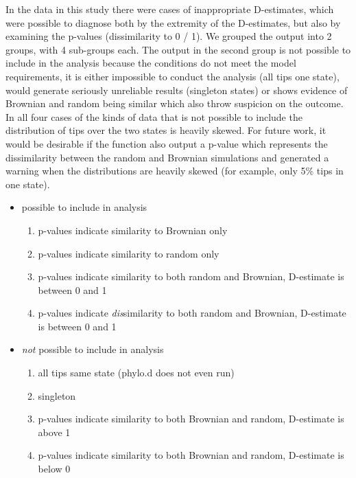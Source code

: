 \documentclass[12pt,letterpaper]{article}
\begin{document}
In the data in this study there were cases of inappropriate D-estimates, which were possible to diagnose both by the extremity of the D-estimates, but also by examining the p-values (dissimilarity to 0 / 1). We grouped the output into 2 groups, with 4 sub-groups each. The output in the second group is not possible to include in the analysis because the conditions do not meet the model requirements, it is either impossible to conduct the analysis (all tips one state), would generate seriously unreliable results (singleton states) or shows evidence of Brownian and random being similar which also throw suspicion on the outcome. In all four cases of the kinds of data that is not possible to include the distribution of tips over the two states is heavily skewed. For future work, it would be desirable if the function also output a p-value which represents the dissimilarity between the random and Brownian simulations and generated a warning when the distributions are heavily skewed (for example, only 5\% tips in one state). 


\begin{itemize}
    \item \colorbox{spec_color_lightgreen!50}{possible to include in analysis}
    \begin{enumerate}[label=(\roman*)]
     \item p-values indicate similarity to Brownian only
      \item p-values indicate similarity to random only
      \item p-values indicate similarity to both random and Brownian, D-estimate is between 0 and 1
      \item p-values indicate \emph{dis}similarity to both random and Brownian, D-estimate is between 0 and 1
    \end{enumerate}
    \item \colorbox{spec_color_orange!50}{\emph{not} possible to include in analysis}
    \begin{enumerate}[label=(\roman*)]
        \item all tips same state (phylo.d does not even run)
        \item singleton
        \item p-values indicate similarity to both Brownian and random, D-estimate is above 1
        \item p-values indicate similarity to both Brownian and random, D-estimate is below 0
    \end{enumerate}
    
\end{itemize}
\end{document}
